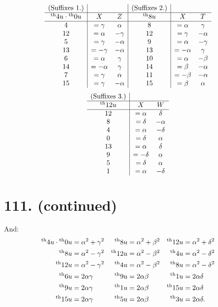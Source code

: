 \documentclass[11pt,a4paper]{book}
\providecommand{\uth}{\textsuperscript{th}}
\begin{document}
\[
\begin{array}{c|cc|c|cc}
\text{(Suffixes 1.)} & & & \text{(Suffixes 2.)} & & \\
\hline
\uth{4}u \cdot \uth{0}u & X & Z & \uth{8}u & X & T \\
\hline
4 & = \gamma & \alpha & 8 & = \alpha & \gamma \\
12 & = \alpha & -\gamma & 12 & = \gamma & -\alpha \\
5 & = \gamma & -\alpha & 9 & = \alpha & -\gamma \\
13 & = -\gamma & -\alpha & 13 & = -\alpha & \gamma \\
6 & = \alpha & \gamma & 10 & = \alpha & -\beta \\
14 & = -\alpha & \gamma & 14 & = \beta & -\alpha \\
7 & = \gamma & \alpha & 11 & = -\beta & -\alpha \\
15 & = \gamma & -\alpha & 15 & = \beta & \alpha
\end{array}
\]
\[
\begin{array}{c|cc}
\text{(Suffixes 3.)} & & \\
\hline
\uth{12}u & X & W \\
\hline
12 & = \alpha & \delta \\
8 & = \delta & -\alpha \\
4 & = \alpha & -\delta \\
0 & = \delta & \alpha \\
13 & = \alpha & \delta \\
9 & = -\delta & \alpha \\
5 & = \delta & \alpha \\
1 & = \alpha & -\delta
\end{array}
\]

\newpage
\section*{111. (continued)}
\label{sec:111cont}

And:
\begin{align*}
\uth{4}u \cdot \uth{0}u &= \alpha^2 + \gamma^2 & \uth{8}u &= \alpha^2 + \beta^2 & \uth{12}u &= \alpha^2 + \delta^2 \\
\uth{8}u &= \alpha^2 - \gamma^2 & \uth{12}u &= \alpha^2 - \beta^2 & \uth{4}u &= \alpha^2 - \delta^2 \\
\uth{12}u &= \alpha^2 - \gamma^2 & \uth{4}u &= \alpha^2 - \beta^2 & \uth{8}u &= \alpha^2 - \delta^2 \\
\uth{6}u &= 2\alpha\gamma & \uth{9}u &= 2\alpha\beta & \uth{1}u &= 2\alpha\delta \\
\uth{9}u &= 2\alpha\gamma & \uth{1}u &= 2\alpha\beta & \uth{15}u &= 2\alpha\delta \\
\uth{15}u &= 2\alpha\gamma & \uth{5}u &= 2\alpha\beta & \uth{3}u &= 2\alpha\delta.
\end{align*}
\end{document}

